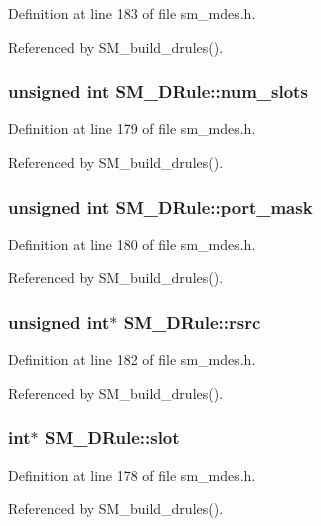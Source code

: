 Definition at line 183 of file sm\_\-mdes.h.

Referenced by SM\_\-build\_\-drules().
\subsubsection{\setlength{\rightskip}{0pt plus 5cm}unsigned int \bf{SM\_\-DRule::num\_\-slots}}\label{structSM__DRule_5f4bb499caadc452e2205098ffee2b79}




Definition at line 179 of file sm\_\-mdes.h.

Referenced by SM\_\-build\_\-drules().
\subsubsection{\setlength{\rightskip}{0pt plus 5cm}unsigned int \bf{SM\_\-DRule::port\_\-mask}}\label{structSM__DRule_2c640353a12c5ba43d27c99022373adc}




Definition at line 180 of file sm\_\-mdes.h.

Referenced by SM\_\-build\_\-drules().
\subsubsection{\setlength{\rightskip}{0pt plus 5cm}unsigned int$\ast$ \bf{SM\_\-DRule::rsrc}}\label{structSM__DRule_c8588f000d9fcc8548e009416e92df37}




Definition at line 182 of file sm\_\-mdes.h.

Referenced by SM\_\-build\_\-drules().
\subsubsection{\setlength{\rightskip}{0pt plus 5cm}int$\ast$ \bf{SM\_\-DRule::slot}}\label{structSM__DRule_9f331dda0f279c0d520ea1ea6b602972}




Definition at line 178 of file sm\_\-mdes.h.

Referenced by SM\_\-build\_\-drules().
